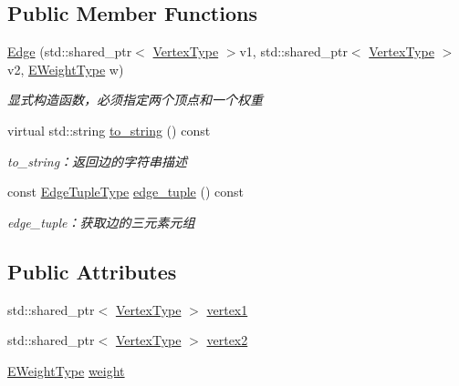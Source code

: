 \subsection*{Public Member Functions}
\begin{DoxyCompactItemize}
\item 
\hyperlink{struct_introduction_to_algorithm_1_1_graph_algorithm_1_1_edge_adf42723a706c3ff53b1d1bb612dfe03b}{Edge} (std\+::shared\+\_\+ptr$<$ \hyperlink{struct_introduction_to_algorithm_1_1_graph_algorithm_1_1_edge_a2a7bb332de66131ed664eb279c7ac1ed}{Vertex\+Type} $>$v1, std\+::shared\+\_\+ptr$<$ \hyperlink{struct_introduction_to_algorithm_1_1_graph_algorithm_1_1_edge_a2a7bb332de66131ed664eb279c7ac1ed}{Vertex\+Type} $>$v2, \hyperlink{struct_introduction_to_algorithm_1_1_graph_algorithm_1_1_edge_a95cf631669c2a0d1bebb58ba2af110de}{E\+Weight\+Type} w)
\begin{DoxyCompactList}\small\item\em 显式构造函数，必须指定两个顶点和一个权重 \end{DoxyCompactList}\item 
virtual std\+::string \hyperlink{struct_introduction_to_algorithm_1_1_graph_algorithm_1_1_edge_a9f7ecd0678638168991435c8370c8dae}{to\+\_\+string} () const 
\begin{DoxyCompactList}\small\item\em to\+\_\+string：返回边的字符串描述 \end{DoxyCompactList}\item 
const \hyperlink{struct_introduction_to_algorithm_1_1_graph_algorithm_1_1_edge_a6cc12c05f7645ce74a6cff13b9ea932c}{Edge\+Tuple\+Type} \hyperlink{struct_introduction_to_algorithm_1_1_graph_algorithm_1_1_edge_a1068057fa7240467e079d66a1a5edd7a}{edge\+\_\+tuple} () const 
\begin{DoxyCompactList}\small\item\em edge\+\_\+tuple：获取边的三元素元组 \end{DoxyCompactList}\end{DoxyCompactItemize}
\subsection*{Public Attributes}
\begin{DoxyCompactItemize}
\item 
std\+::shared\+\_\+ptr$<$ \hyperlink{struct_introduction_to_algorithm_1_1_graph_algorithm_1_1_edge_a2a7bb332de66131ed664eb279c7ac1ed}{Vertex\+Type} $>$ \hyperlink{struct_introduction_to_algorithm_1_1_graph_algorithm_1_1_edge_a634535a3f12be42c3c6ffb6d3c604fb7}{vertex1}
\item 
std\+::shared\+\_\+ptr$<$ \hyperlink{struct_introduction_to_algorithm_1_1_graph_algorithm_1_1_edge_a2a7bb332de66131ed664eb279c7ac1ed}{Vertex\+Type} $>$ \hyperlink{struct_introduction_to_algorithm_1_1_graph_algorithm_1_1_edge_a762ca9f6ad5abb1adf8b7e1319ea3b52}{vertex2}
\item 
\hyperlink{struct_introduction_to_algorithm_1_1_graph_algorithm_1_1_edge_a95cf631669c2a0d1bebb58ba2af110de}{E\+Weight\+Type} \hyperlink{struct_introduction_to_algorithm_1_1_graph_algorithm_1_1_edge_a139b40cb4524df195804bdce7a117164}{weight}
\end{DoxyCompactItemize}


